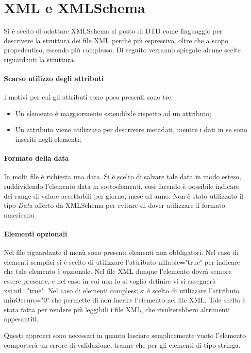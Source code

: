 \section{XML e XMLSchema}
Si è scelto di adottare XMLSchema al posto di DTD come linguaggio per descrivere la struttura dei file XML perchè più espressivo, oltre che a scopo propedeutico, essendo più complesso. Di seguito verranno spiegate alcune scelte riguardanti la struttura.

\paragraph{Scarso utilizzo degli attributi}

I motivi per cui gli attributi sono poco presenti sono tre:
\begin{itemize}
\item Un elemento è maggiormente estendibile rispetto ad un attributo;
\item Un attributo viene utilizzato per descrivere metadati, mentre i dati in se sono inseriti negli elementi;
\end{itemize}

\paragraph{Formato della data}
In molti file è richiesta una data. Si è scelto di salvare tale data in modo esteso, suddividendo l'elemento data in sottoelementi, cosi facendo è possibile indicare dei range di valore accettabili per giorno, mese ed anno. 
Non è stato utilizzato il tipo \emph{Data} offerto da XMLSchema per evitare di dover utilizzare il formato americano.

\paragraph{Elementi opzionali}
Nel file riguardante il menù sono presenti elementi non obbligatori. Nel caso di elementi semplici si è scelto di utilizzare l'attributo nillable="true" per indicare che tale elemento è opzionale. Nel file XML dunque l'elemento dovrà sempre essere presente, e nel caso in cui non lo si voglia definire vi si assegnerà xsi:nil="true".  
Nel caso di elementi complessi si è scelto di utilizzare l'attributo minOccurs="0" che permette di non inerire l'elemento nel file XML. Tale scelta è stata fatta per rendere più leggibili i file XML, che risulterebbero altrimenti appesantiti.

Questi approcci sono necessari in quanto lasciare semplicemente vuoto l'elemento comporterà un errore di validazione, tranne che per gli elementi di tipo stringa.

